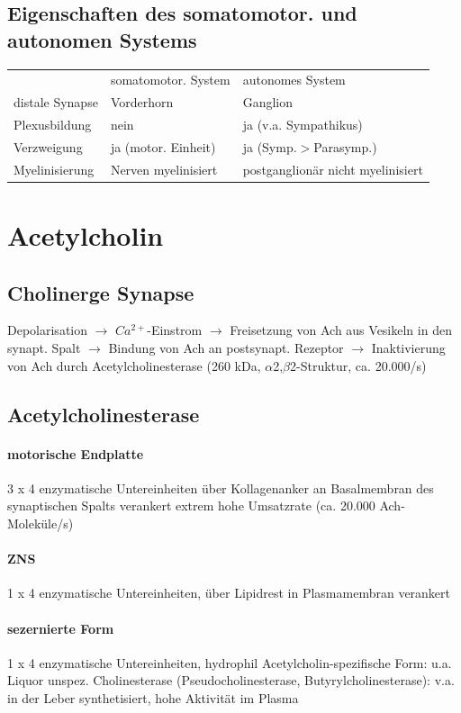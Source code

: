 \documentclass[10pt,a4paper]{report}
\begin{document}
\subsection{Eigenschaften des somatomotor. und autonomen Systems}
\begin{tabularx}{\textwidth}{XXX}
&somatomotor. System&autonomes System\\
distale Synapse&Vorderhorn&	Ganglion\\
Plexusbildung&nein&ja (v.a. Sympathikus)\\
Verzweigung&ja (motor. Einheit)&ja (Symp.$>$Parasymp.)\\
Myelinisierung&Nerven myelinisiert&postganglionär nicht myelinisiert\\
\end{tabularx}
\section{Acetylcholin}
\subsection{Cholinerge Synapse}
Depolarisation $\rightarrow$ $Ca^{2+}$-Einstrom $\rightarrow$ 	Freisetzung von Ach aus Vesikeln in den synapt. Spalt $\rightarrow$ Bindung von Ach an postsynapt. Rezeptor $\rightarrow$ Inaktivierung von Ach durch Acetylcholinesterase (260 kDa, $\alpha$2,$\beta$2-Struktur, ca. 20.000/s)
\subsection{Acetylcholinesterase}
\paragraph{motorische Endplatte}
3 x 4 enzymatische Untereinheiten über Kollagenanker an Basalmembran des synaptischen Spalts verankert extrem hohe Umsatzrate (ca. 20.000 Ach-Moleküle/s)
\paragraph{ZNS}
1 x 4 enzymatische Untereinheiten, über Lipidrest in Plasmamembran verankert
\paragraph{sezernierte Form} 
1 x 4 enzymatische Untereinheiten, hydrophil
Acetylcholin-spezifische Form: u.a. Liquor
unspez. Cholinesterase (Pseudocholinesterase, Butyrylcholinesterase): v.a. in der Leber synthetisiert, hohe Aktivität im Plasma
\end{document}

